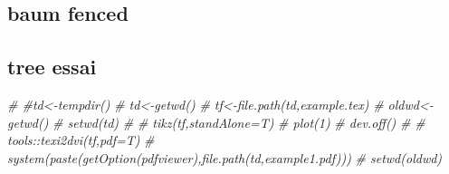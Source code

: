 \documentclass[
]{article}
\newenvironment{Shaded}{\begin{snugshade}}{\end{snugshade}}
\newcommand{\CommentTok}[1]{\textcolor[rgb]{0.56,0.35,0.01}{\textit{#1}}}
\begin{document}
\hypertarget{baum-fenced}{%
\subsection{baum fenced}\label{baum-fenced}}

\begin{figure}

\end{figure}

\hypertarget{tree-essai}{%
\subsection{tree essai}\label{tree-essai}}

\begin{figure}[h]\label{fail prevdepth}
  \end{figure}

\begin{Shaded}
\begin{Highlighting}[]
\CommentTok{\# \#td\textless{}{-}tempdir()}
\CommentTok{\# td\textless{}{-}getwd()}
\CommentTok{\# tf\textless{}{-}file.path(td,\textquotesingle{}example.tex\textquotesingle{})}
\CommentTok{\# oldwd\textless{}{-}getwd()}
\CommentTok{\# setwd(td)}
\CommentTok{\# }
\CommentTok{\# tikz(tf,standAlone=T)}
\CommentTok{\# plot(1)}
\CommentTok{\# dev.off()}
\CommentTok{\# }
\CommentTok{\# tools::texi2dvi(tf,pdf=T)}
\CommentTok{\# system(paste(getOption(\textquotesingle{}pdfviewer\textquotesingle{}),file.path(td,\textquotesingle{}example1.pdf\textquotesingle{})))}
\CommentTok{\# setwd(oldwd)}
\end{Highlighting}
\end{Shaded}
\end{document}
